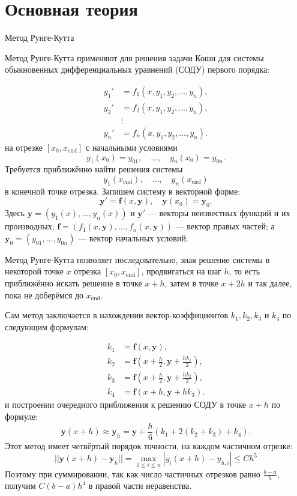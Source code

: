 \documentclass[a4paper, 14pt]{extarticle}
\begin{document}
\section{Основная теория}
\begin{justify}

\noindent\large {Метод Рунге-Кутта}\\ \normalsize

Метод Рунге-Кутта применяют для решения задачи Коши для системы обыкновенных дифференциальных уравнений (СОДУ)
первого порядка:

\begin{equation*}
	\begin{aligned}
		y_1' &= f_1(x, y_1, y_2, \ldots, y_n), \\
		y_2' &= f_2(x, y_1, y_2, \ldots, y_n), \\
		&\vdots \\
		y_n' &= f_n(x, y_1, y_2, \ldots, y_n).
	\end{aligned}
\end{equation*}
на отрезке $[x_0, x_{\text{end}}]$ с начальными условиями 
\[
y_1(x_0) = y_{01}, \quad \ldots, \quad y_n(x_0) = y_{0n}.
\]
Требуется приближённо найти решения системы 
\[
y_1(x_{\text{end}}), \quad \ldots, \quad y_n(x_{\text{end}})
\]
в конечной точке отрезка.
Запишем систему в векторной форме:
\[
\mathbf{y}' = \mathbf{f}(x, \mathbf{y}), \quad \mathbf{y}(x_0) = \mathbf{y}_0.
\]
Здесь $\mathbf{y} = (y_1(x), \ldots, y_n(x))$ и $\mathbf{y}'$ — векторы неизвестных функций и их производных; 
$\mathbf{f} = (f_1(x, \mathbf{y}), \ldots, f_n(x, \mathbf{y}))$ — вектор правых частей; 
а $\mathbf{y}_0 = (y_{01}, \ldots, y_{0n})$ — вектор начальных условий.

Метод Рунге-Кутта позволяет последовательно, зная решение системы в некоторой точке $x$ отрезка $[x_0, x_{\text{end}}]$,
продвигаться на шаг $h$, то есть приближённо искать решение в точке $x + h$, затем в точке $x + 2h$ и так далее, пока 
не доберёмся до $x_{\text{end}}$.

Сам метод заключается в нахождении вектор-коэффициентов $k_1, k_2, k_3$ и $k_4$ по следующим формулам:

\begin{equation*}
	\begin{aligned}
		k_1 &= \mathbf{f}(x, \mathbf{y}), \\
		k_2 &= \mathbf{f}(x + \frac{h}{2}, \mathbf{y} + \frac{hk_1}{2}), \\
		k_3 &= \mathbf{f}(x + \frac{h}{2}, \mathbf{y} + \frac{hk_2}{2}), \\
		k_4 &= \mathbf{f}(x + h, \mathbf{y} + hk_3).
	\end{aligned}
\end{equation*}
и построении очередного приближения к решению СОДУ в точке $x + h$ по формуле:
\[
\mathbf{y}(x + h) \approx \mathbf{y}_h = \mathbf{y} + \frac{h}{6}(k_1 + 2(k_2 + k_3) + k_4).
\]
Этот метод имеет четвёртый порядок точности, на каждом частичном отрезке:
\[
||\mathbf{y}(x + h) - \mathbf{y}_h|| = \max_{1 \le i \le n} \left| y_i(x + h) - y_{h, i} \right| \leq Ch^5
\]
Поэтому при суммировании, так как число частичных отрезков равно $\frac{b - a}{h}$, получим $C(b - a)h^4$ в правой части 
неравенства. 


\end{justify}
\end{document}
